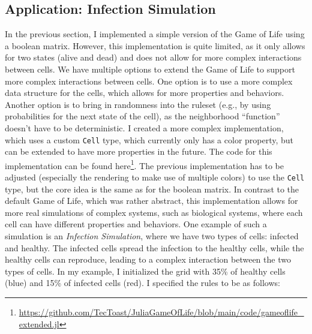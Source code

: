 \documentclass[a4paper,12pt]{llncs}
\numberwithin{equation}{section}
\begin{document}
\subsection{Application: Infection Simulation}
In the previous section, I implemented a simple version of the Game of Life using a boolean matrix.
However, this implementation is quite limited, as it only allows for two states (alive and dead) and does not allow for more complex interactions between cells.
We have multiple options to extend the Game of Life to support more complex interactions between cells.
One option is to use a more complex data structure for the cells, which allows for more properties and behaviors.
Another option is to bring in randomness into the ruleset (e.g., by using probabilities for the next state of the cell), as the neighborhood ``function'' doesn't have to be deterministic.
I created a more complex implementation, which uses a custom \texttt{Cell} type, which currently only has a color property, but can be extended to have more properties in the future.
The code for this implementation can be found here\footnote{\url{https://github.com/TecToast/JuliaGameOfLife/blob/main/code/gameoflife_extended.jl}}.
The previous implementation has to be adjusted (especially the rendering to make use of multiple colors) to use the \texttt{Cell} type, but the core idea is the same as for the boolean matrix.
In contrast to the default Game of Life, which was rather abstract, this implementation allows for more real simulations of complex systems, such as biological systems, where each cell can have different properties and behaviors.
One example of such a simulation is an \emph{Infection Simulation}, where we have two types of cells: infected and healthy.
The infected cells spread the infection to the healthy cells, while the healthy cells can reproduce, leading to a complex interaction between the two types of cells.
In my example, I initialized the grid with 35\% of healthy cells (blue) and 15\% of infected cells (red). I specified the rules to be as follows:
\end{document}
